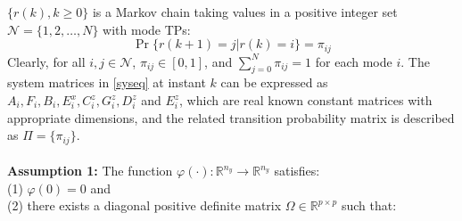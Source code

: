 \documentclass[conference]{IEEEtran}
\begin{document}
$\{r(k),k\geq0\}$ is a Markov chain taking values in a positive integer set $\mathcal{N}=\{1,2,\dots,N\}$ with mode TPs:
\begin{equation}
	\Pr\{r(k+1)=j|r(k)=i\}=\pi_{ij}
\end{equation}
Clearly, for all $i,j\in\mathcal{N}$, $\pi_{ij}\in[0,1]$, and $\sum_{j=0}^{N}\pi_{ij}=1$ for each mode $i$. The system matrices in \eqref{syseq} at instant $k$ can be expressed as $A_i,F_i,B_i,E^x_i,C^z_i,G^z_i,D^z_i$ and $E^z_i$, which are real known constant matrices with appropriate dimensions, and the related transition probability matrix is described as $\mathit{\Pi}=\{\pi_{ij}\}$.\\
\\
\textbf{Assumption 1:} The function $\varphi(\cdot): \mathbb{R}^{n_y}\rightarrow\mathbb{R}^{n_y}$ satisfies:\\ 
(1) $\varphi(0)=0$ and \\
(2) there exists a diagonal positive definite matrix $\varOmega \in\mathbb{R}^{p\times p}$ such that: 
\end{document}
